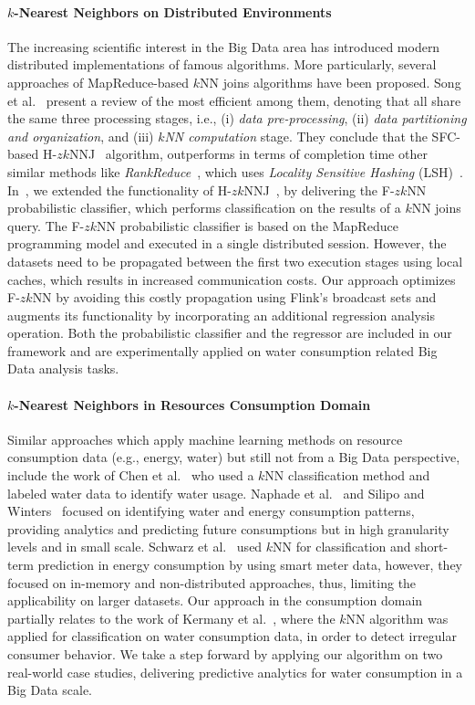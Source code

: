 \paragraph{\texorpdfstring{$k$}--Nearest Neighbors on Distributed Environments} The increasing scientific interest in the Big Data area has introduced modern distributed implementations of famous algorithms. More particularly, several approaches of MapReduce-based $k$NN joins algorithms have been proposed. Song et al.~\cite{song2015hal} present a review of the most efficient among them, denoting that all share the same three processing stages, i.e., (i) \textit{data pre-processing}, (ii) \textit{data partitioning and organization}, and (iii) \textit{$k$NN computation} stage. They conclude that the SFC-based H-$zk$NNJ~\cite{zhang2012epk} algorithm, outperforms in terms of completion time other similar methods like \textit{RankReduce}~\cite{stupar2010rankreduce}, which uses \textit{Locality Sensitive Hashing} (LSH)~\cite{indyk1998ann}. In~\cite{chatzigeorgakidis2015mapreduce}, we extended the functionality of H-$zk$NNJ~\cite{zhang2012epk}, by delivering the F-$zk$NN probabilistic classifier, which performs classification on the results of a $k$NN joins query. The F-$zk$NN probabilistic classifier is based on the MapReduce programming model and executed in a single distributed session. However, the datasets need to be propagated between the first two execution stages using local caches, which results in increased communication costs. Our approach optimizes F-$zk$NN by avoiding this costly propagation using Flink's broadcast sets and augments its functionality by incorporating an additional regression analysis operation. Both the probabilistic classifier and the regressor are included in our framework and are experimentally applied on water consumption related Big Data analysis tasks.

\paragraph{\texorpdfstring{$k$}--Nearest Neighbors in Resources Consumption Domain} Similar approaches which apply machine learning methods on resource consumption data (e.g., energy, water) but still not from a Big Data perspective, include the work of Chen et al.~\cite{chen2011aab} who used a $k$NN classification method and labeled water data to identify water usage. Naphade et al.~\cite{swp2011} and Silipo and Winters~\cite{bdse2013} focused on identifying water and energy consumption patterns, providing analytics and predicting future consumptions but in high granularity levels and in small scale. Schwarz et al.~\cite{schwarz2012lpss} used $k$NN for classification and short-term prediction in energy consumption by using smart meter data, however, they focused on in-memory and non-distributed approaches, thus, limiting the applicability on larger datasets. Our approach in the consumption domain partially relates to the work of Kermany et al.~\cite{Kermany2013aam}, where the $k$NN algorithm was applied for classification on water consumption data, in order to detect irregular consumer behavior. We take a step forward by applying our algorithm on two real-world case studies, delivering predictive analytics for water consumption in a Big Data scale.
